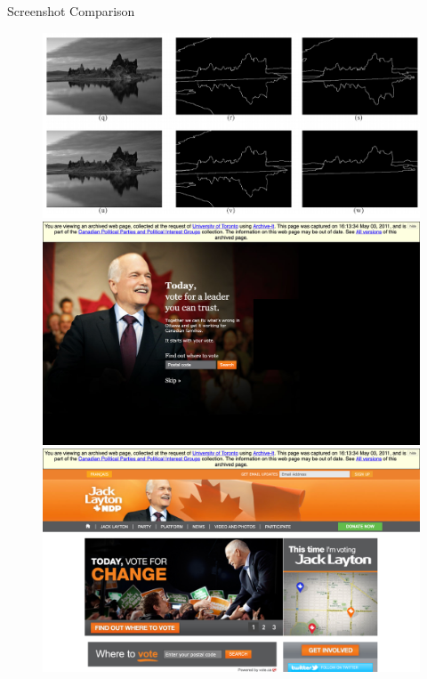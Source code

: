 \documentclass[10pt]{beamer}
\begin{document}
\begin{frame}{Screenshot Comparison}
\begin{figure}
\centering
\includegraphics[scale=0.25]{SSIM}\\
\includegraphics[scale=0.06]{../homepage-images-ndp/52-ndp}
\includegraphics[scale=0.06]{../homepage-images-ndp/53-ndp}
\end{figure}
\end{frame}
\end{document}
